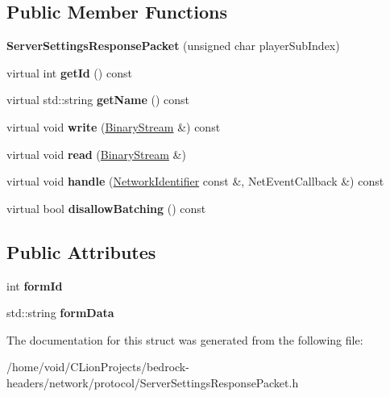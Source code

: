 \subsection*{Public Member Functions}
\begin{DoxyCompactItemize}
\item 
\mbox{\label{struct_server_settings_response_packet_a8e1067452f46440d8f846bbd796a1e6d}} 
{\bfseries Server\+Settings\+Response\+Packet} (unsigned char player\+Sub\+Index)
\item 
\mbox{\label{struct_server_settings_response_packet_a54a1afb58faff39c4bf092aaa0bbe6a2}} 
virtual int {\bfseries get\+Id} () const
\item 
\mbox{\label{struct_server_settings_response_packet_aca932cc2423d13bc55da096da28ab812}} 
virtual std\+::string {\bfseries get\+Name} () const
\item 
\mbox{\label{struct_server_settings_response_packet_a87d3ed763c65107f9beb8ef9cf63234d}} 
virtual void {\bfseries write} (\mbox{\hyperlink{struct_binary_stream}{Binary\+Stream}} \&) const
\item 
\mbox{\label{struct_server_settings_response_packet_ac0ce0c29d09e1f9d790d64d7ad0f33d3}} 
virtual void {\bfseries read} (\mbox{\hyperlink{struct_binary_stream}{Binary\+Stream}} \&)
\item 
\mbox{\label{struct_server_settings_response_packet_a6f93a96115a84a8f471b5075b323b741}} 
virtual void {\bfseries handle} (\mbox{\hyperlink{struct_network_identifier}{Network\+Identifier}} const \&, Net\+Event\+Callback \&) const
\item 
\mbox{\label{struct_server_settings_response_packet_a3291faab260ae94184e9af0e2ae309cf}} 
virtual bool {\bfseries disallow\+Batching} () const
\end{DoxyCompactItemize}
\subsection*{Public Attributes}
\begin{DoxyCompactItemize}
\item 
\mbox{\label{struct_server_settings_response_packet_a0467791f59bfd33bbb712cedf61e5ab1}} 
int {\bfseries form\+Id}
\item 
\mbox{\label{struct_server_settings_response_packet_ac0c6683d0658e31886892a2595b5a1ff}} 
std\+::string {\bfseries form\+Data}
\end{DoxyCompactItemize}


The documentation for this struct was generated from the following file\+:\begin{DoxyCompactItemize}
\item 
/home/void/\+C\+Lion\+Projects/bedrock-\/headers/network/protocol/Server\+Settings\+Response\+Packet.\+h\end{DoxyCompactItemize}

